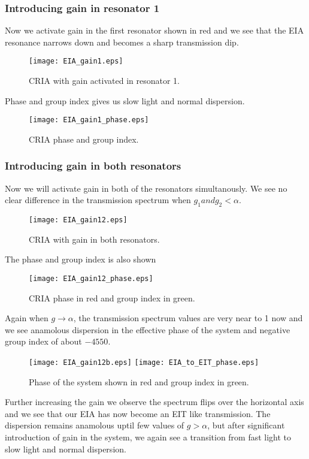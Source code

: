 \subsubsection{Introducing gain in resonator 1}
Now we activate gain in the first resonator shown in red and we see that the EIA resonance narrows down and becomes a sharp transmission dip.

\begin{figure}[h]
\centering
\texttt{[image: EIA\_gain1.eps]}
\caption{CRIA with gain activated in resonator 1.}
\end{figure}

Phase and group index gives us slow light and normal dispersion.

\begin{figure}[h]
\centering
\texttt{[image: EIA\_gain1\_phase.eps]}
\caption{CRIA phase and group index.}
\end{figure}


\subsubsection{Introducing gain in both resonators}
Now we will activate gain in both of the resonators simultanously. We see no clear difference in the transmission spectrum when $g_{1} and g_{2} < \alpha$.

\begin{figure}[h]
\centering
\texttt{[image: EIA\_gain12.eps]}
\caption{CRIA with gain in both resonators.}
\end{figure}

The phase and group index is also shown

\begin{figure}[h]
\centering
\texttt{[image: EIA\_gain12\_phase.eps]}
\caption{CRIA phase in red and group index in green.}
\end{figure}

Again when $g \to \alpha$, the transmission spectrum values are very near to 1 now and we see anamolous dispersion in the effective phase of the system and negative group index of about $-4550$.

\begin{figure}[h]
\centering
\texttt{[image: EIA\_gain12b.eps]}
\texttt{[image: EIA\_to\_EIT\_phase.eps]}
\caption{Phase of the system shown in red and group index in green.}
\end{figure}

Further increasing the gain we observe the spectrum flips over the horizontal axis and we see that our EIA has now become an EIT like transmission. The dispersion remains anamolous uptil few values of $g > \alpha$, but after significant introduction of gain in the system, we again see a transition from fast light to slow light and normal dispersion.

